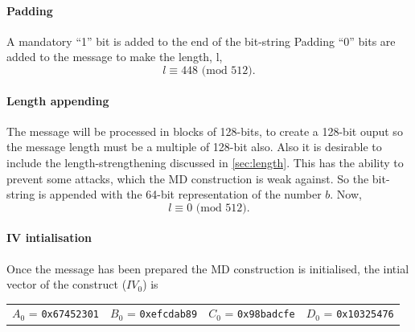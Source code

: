 \documentclass[a4paper,12pt]{article}
\begin{document}
\paragraph{Padding}
\label{sec:md5pad}
A mandatory ``1'' bit is added to the end of the bit-string 
Padding ``0'' bits are added to the message to make the length, l, $$l \equiv 448 \text{ (mod } 512).$$

\paragraph{Length appending}
The message will be processed in blocks of 128-bits, to create a 128-bit ouput so the message length must be a multiple of 128-bit also. Also it is desirable to include the length-strengthening discussed in \ref{sec:length}. This has the ability to prevent some attacks, which the MD construction is weak against. So the bit-string is appended with the 64-bit representation of the number $b$. Now, $$l \equiv 0 \text{ (mod } 512).$$

\paragraph{IV intialisation}
Once the message has been prepared the MD construction is initialised, the intial vector of the construct ($IV_0$) is

\begin{tabular}{ l l l l}
	$A_0$ = \texttt{0x67452301}& $B_0$ = \texttt{0xefcdab89}& $C_0$ = \texttt{0x98badcfe}& $D_0$ = \texttt{0x10325476}
\end{tabular}
\end{document}
